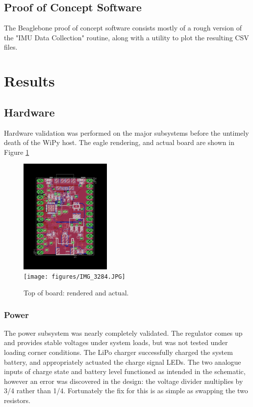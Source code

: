 \documentclass[11pt,oneside]{amsart}
\begin{document}
\subsection{Proof of Concept Software}
The Beaglebone proof of concept software consists mostly of a rough version of the "IMU Data Collection" routine, along with a utility to plot the resulting CSV files. 

\section{Results}
\subsection{Hardware}
Hardware validation was performed on the major subsystems before the untimely death of the WiPy host. The eagle rendering, and actual board are shown in Figure \ref{fig:board}
\begin{figure}[htbp]
\begin{center}
\includegraphics[width=0.4\textwidth]{figures/board.png}\\
\texttt{[image: figures/IMG\_3284.JPG]}
\caption{Top of board: rendered and actual.}
\label{fig:board}
\end{center}
\end{figure}

\subsubsection{Power}
The power subsystem was nearly completely validated. The regulator comes up and provides stable voltages under system loads, but was not tested under loading corner conditions. The LiPo charger successfully charged the system battery, and appropriately actuated the charge signal LEDs. The two analogue inputs of charge state and battery level functioned as intended in the schematic, however an error was discovered in the design: the voltage divider multiplies by 3/4 rather than 1/4. Fortunately the fix for this is as simple as swapping the two resistors.
\end{document}
